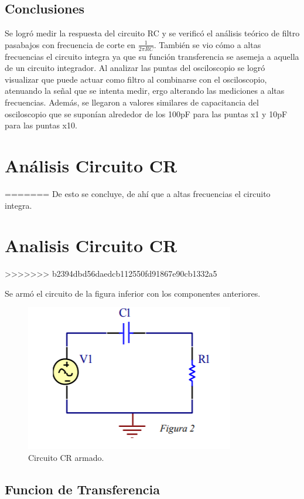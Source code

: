\subsection{Conclusiones}

Se logró medir la respuesta del circuito RC  y se verificó el análisis teórico de filtro pasabajos con frecuencia de corte en $\frac{1}{2\pi RC}$. También se vio cómo a altas frecuencias el circuito integra ya que su función transferencia se asemeja a aquella de un circuito integrador.
Al analizar las puntas del osciloscopio se logró visualizar que puede actuar como filtro al combinarse con el osciloscopio, atenuando la señal que se intenta medir, ergo alterando las mediciones a altas frecuencias.
Además, se llegaron a valores similares de capacitancia del osciloscopio que se suponían alrededor de los 100pF para las puntas x1 y 10pF para las puntas x10.

\section{Análisis Circuito CR}
=======
De esto se concluye, de ahí que a altas frecuencias el circuito integra.

\section{Analisis Circuito CR}
>>>>>>> b2394dbd56daedcb112550fd91867e90cb1332a5

Se armó el circuito de la figura inferior con los componentes anteriores.

\begin{figure}[h!]
\centering
\includegraphics[scale=0.5]{crCircuito.png}
\caption{Circuito CR armado.}
\label{fig:CR}
\end{figure}


\subsection{Funcion de Transferencia}


